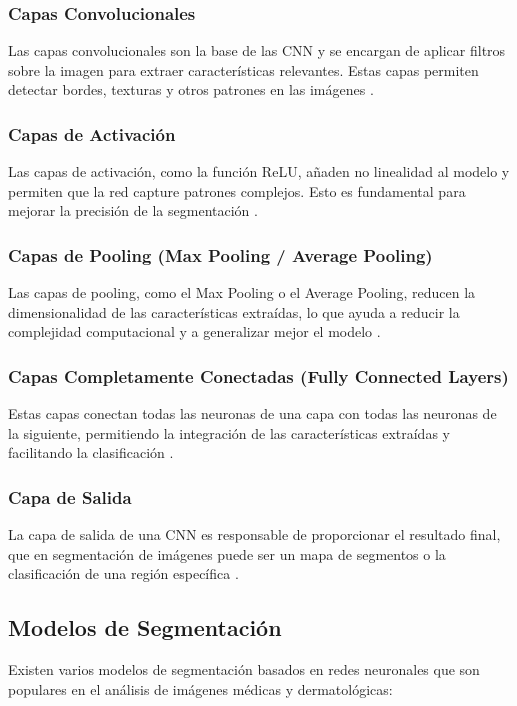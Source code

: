\subsubsection{Capas Convolucionales}
Las capas convolucionales son la base de las CNN y se encargan de aplicar filtros sobre la imagen para extraer características relevantes. Estas capas permiten detectar bordes, texturas y otros patrones en las imágenes \cite{autor2021conv}.

\subsubsection{Capas de Activación}
Las capas de activación, como la función ReLU, añaden no linealidad al modelo y permiten que la red capture patrones complejos. Esto es fundamental para mejorar la precisión de la segmentación \cite{autor2020relu}.

\subsubsection{Capas de Pooling (Max Pooling / Average Pooling)}
Las capas de pooling, como el Max Pooling o el Average Pooling, reducen la dimensionalidad de las características extraídas, lo que ayuda a reducir la complejidad computacional y a generalizar mejor el modelo \cite{autor2019pooling}.

\subsubsection{Capas Completamente Conectadas (Fully Connected Layers)}
Estas capas conectan todas las neuronas de una capa con todas las neuronas de la siguiente, permitiendo la integración de las características extraídas y facilitando la clasificación \cite{autor2021fc}.

\subsubsection{Capa de Salida}
La capa de salida de una CNN es responsable de proporcionar el resultado final, que en segmentación de imágenes puede ser un mapa de segmentos o la clasificación de una región específica \cite{autor2022output}.

\subsection{Modelos de Segmentación}
Existen varios modelos de segmentación basados en redes neuronales que son populares en el análisis de imágenes médicas y dermatológicas:

